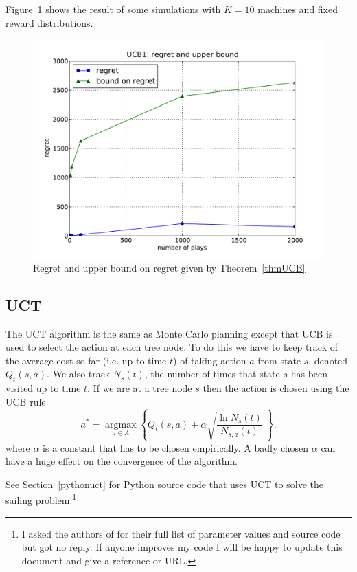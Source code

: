 \documentclass[12pt,amstags,fleqn]{article}
\theoremstyle{plain}
\theoremstyle{definition}
\theoremstyle{definition}
\begin{document}
Figure~\ref{ucbregret} shows the result of some simulations with $K =
10$ machines and fixed reward distributions.
\begin{figure}[htb]
\begin{center}
\includegraphics[width=.75\textwidth]{regret_and_bound.pdf}
\end{center}
\caption{Regret and upper bound on regret given by Theorem~\ref{thmUCB}}\label{ucbregret}
\end{figure}

\subsection{UCT}

The UCT algorithm is the same as Monte Carlo planning except that UCB is used to
select the action at each tree node. To do this we have to keep track of
the average cost so far (i.e. up to time $t$)
of taking action $a$ from state $s$,
denoted $Q_t(s,a)$. We also track $N_{s}(t)$, the number of times
that state $s$ has been visited up to time $t$. If we are
at a tree node $s$ then the action is chosen using
the UCB rule
\begin{equation}\label{eqnuct}
a^* = \underset{a \in A}{\operatorname{argmax}} 
 \left\{ Q_t(s,a) + \alpha \sqrt{\frac{\ln N_{s}(t)}{N_{s,a}(t)}} \, \right\}.
\end{equation}
where $\alpha$ is a constant that has to be chosen empirically. A badly
chosen $\alpha$ can have a huge effect on the convergence of the
algorithm.

See Section~\ref{pythonuct} for Python source code that uses UCT to
solve the sailing problem.\footnote{I asked the authors of
\cite{Kocsis06banditbased} for their full list of parameter values and source code
but got no reply. If anyone improves my code I will be happy to update
this document and give a reference or URL.}
\end{document}
